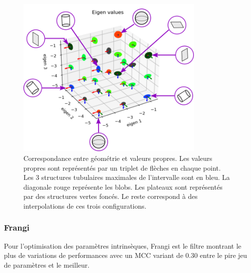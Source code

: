 \begin{figure}[!ht]
  \centering
  \includegraphics[height=8cm]{Images/eigen_meaning_2.png}
  \caption{Correspondance entre géométrie et valeurs propres. Les valeurs propres sont représentés par un triplet de flèches en chaque point. Les 3 structures tubulaires maximales de l'intervalle sont en bleu. La diagonale rouge représente les blobs. Les plateaux sont représentés par des structures vertes foncés. Le reste correspond à des interpolations de ces trois configurations.}
  \label{fig:exemple_geometry}
\end{figure}


\subsubsection{Frangi}
Pour l'optimisation des paramètres intrinsèques, Frangi est le filtre montrant le plus de variations de performances avec un MCC variant de $0.30$ entre le pire jeu de paramètres et le meilleur. 

